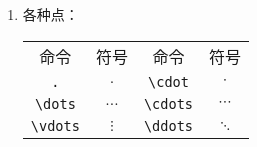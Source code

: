 \begin{multicols}{2}
\begin{enumerate}
\item 各种点：

\begin{tabular}{cccc}
命令 & 符号 & 命令 & 符号 \\
\verb|.| & $.$ & \verb|\cdot| & $\cdot$ \\ 
\verb|\dots| & $\dots$ & \verb|\cdots| & $\cdots$ \\ 
\verb|\vdots| & $\vdots$ & \verb|\ddots| & $\ddots$ \\ 
\end{tabular}

\end{enumerate}
\end{multicols}